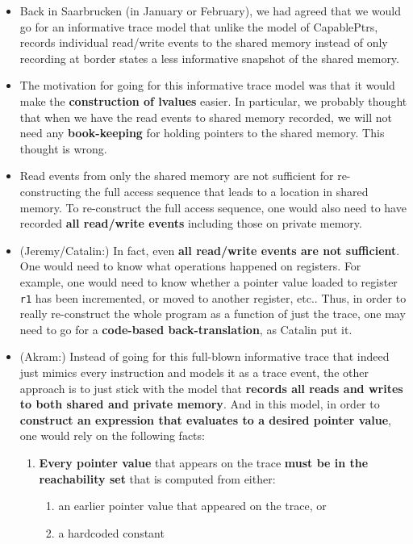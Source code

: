 \documentclass[12pt,a4paper]{article}
\begin{document}
\begin{itemize}
\item Back in Saarbrucken (in January or February),
 we had agreed that we would go for
an informative trace model that unlike the model of CapablePtrs,
records individual read/write events to the shared memory instead of
only recording at border states a less
informative snapshot of the shared memory.

\item The motivation for going for this informative trace model
was that it would make the \textbf{construction of lvalues}
easier. In particular, we probably thought that when we have
the read events to shared memory recorded, we will not need
any \textbf{book-keeping} for holding pointers to the shared memory.
This thought is wrong.

\item Read events from only the shared memory are not sufficient
for re-constructing the full access sequence that leads
to a location in shared memory.
To re-construct the full access sequence, one would also need
to have recorded \textbf{all read/write events} including those
on private memory.

\item (Jeremy/Catalin:)
In fact, even \textbf{all read/write events are not sufficient}.
One would need to know what operations happened on registers.
For example, one would need to know whether a pointer value
loaded to register \texttt{r1} has been incremented, or moved to 
another register, etc..
Thus, in order to really re-construct the whole program as
a function
of just the trace,
 one may need to go for a \textbf{code-based back-translation}, as
 Catalin put it.

\item (Akram:) Instead of going for this
full-blown informative trace that indeed just mimics every instruction
and models it as a trace event, the other approach is to 
just stick with the model that
\textbf{records all reads and writes to both shared and 
	private memory}.
And in this model, in order to
\textbf{construct an expression that evaluates
to a desired pointer value},
one would rely on the following facts:

\begin{enumerate}
\item \textbf{Every pointer value} that appears on the trace
\textbf{must be in the reachability set} that is computed from
either:
\begin{enumerate}
\item an earlier pointer value that appeared on the trace, or
\item a hardcoded constant
\end{enumerate}


\end{enumerate}
\end{itemize}
\end{document}
